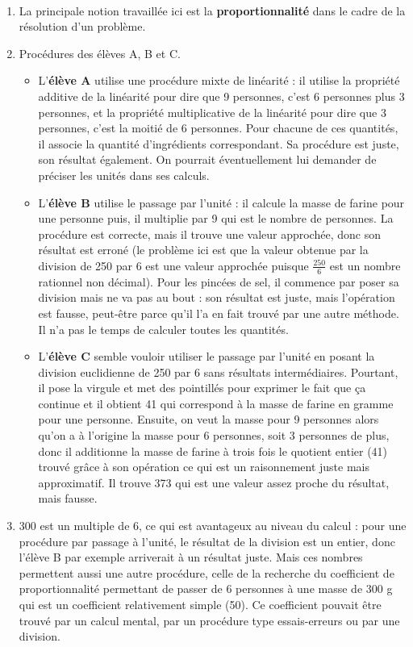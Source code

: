 \ \\ [-5mm]
\begin{enumerate}
   \item La principale notion travaillée ici est la \textbf{proportionnalité} dans le cadre de la résolution d'un problème.
   \item Procédures des élèves A, B et C.
   \begin{itemize}
      \item L'\textbf{élève A} utilise une procédure mixte de linéarité : il utilise la propriété additive de la linéarité pour dire que 9 personnes, c'est 6 personnes plus 3 personnes, et la propriété multiplicative de la linéarité pour dire que 3 personnes, c'est la moitié de 6 personnes. Pour chacune de ces quantités, il associe la quantité d'ingrédients correspondant. Sa procédure est juste, son résultat également. On pourrait éventuellement lui demander de préciser les unités dans ses calculs.
      \item L'\textbf{élève B} utilise le passage par l'unité : il calcule la masse de farine pour une personne puis, il multiplie par 9 qui est le nombre de personnes. La procédure est correcte, mais il trouve une valeur approchée, donc son résultat est erroné (le problème ici est que la valeur obtenue par la division de 250 par 6 est une valeur approchée puisque $\frac{250}{6}$ est un nombre rationnel non décimal). Pour les pincées de sel, il commence par poser sa division mais ne va pas au bout : son résultat est juste, mais l'opération est fausse, peut-être parce qu'il l'a en fait trouvé par une autre méthode. Il n'a pas le temps de calculer toutes les quantités.
      \item L'\textbf{élève C} semble vouloir utiliser le passage par l'unité en posant la division euclidienne de 250 par 6 sans résultats intermédiaires. Pourtant, il pose la virgule et met des pointillés pour exprimer le fait que \og ça continue \fg{} et il obtient 41 qui correspond à la masse de farine en gramme pour une personne. Ensuite, on veut la masse pour 9 personnes alors qu'on a à l'origine la masse pour 6 personnes, soit 3 personnes de plus, donc il additionne la masse de farine à trois fois le quotient entier (41) trouvé grâce à son opération ce qui est un raisonnement juste mais approximatif. Il trouve 373 qui est une valeur assez proche du résultat, mais fausse.
   \end{itemize}
   \item 300 est un multiple de 6, ce qui est avantageux au niveau du calcul : pour une procédure par passage à l'unité, le résultat de la division est un entier, donc l'élève B par exemple arriverait à un résultat juste. Mais ces nombres permettent aussi une autre procédure, celle de la recherche du coefficient de proportionnalité permettant de passer de 6 personnes à une masse de 300 g qui est un coefficient relativement simple (50). Ce coefficient pouvait être trouvé par un calcul mental, par un procédure type essais-erreurs ou par une division.
\end{enumerate}
